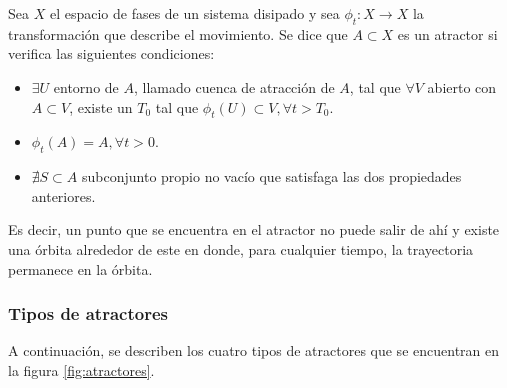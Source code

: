\begin{definition}
	Sea $X$ el espacio de fases de un sistema disipado y sea $\phi_t: X \to X$ la transformación que describe el movimiento. Se dice que $A \subset X$ es un atractor si verifica las siguientes condiciones:
	
	\begin{itemize}
		
		\item $\exists U$ entorno de $A$, llamado cuenca de atracción de $A$, tal que $\forall V$ abierto con $A \subset V$, existe un $T_0$ tal que $\phi_t(U) \subset V, \forall t > T_0$.
		
		\item $\phi_t(A) = A, \forall t > 0$.
		
		\item $\nexists S \subset A$ subconjunto propio no vacío que satisfaga las dos propiedades anteriores.
		
	\end{itemize} 
	
\end{definition} 

Es decir, un punto que se encuentra en el atractor no puede salir de ahí y existe una órbita alrededor de este en donde, para cualquier tiempo, la trayectoria permanece en la órbita.

\subsubsection{Tipos de atractores}

A continuación, se describen los cuatro tipos de atractores que se encuentran en la figura \ref{fig:atractores}.


